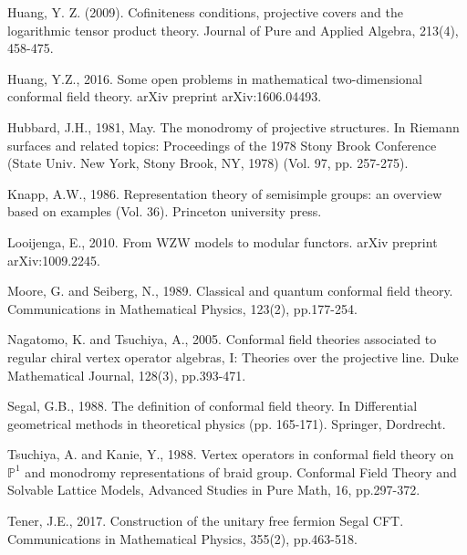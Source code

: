 \documentclass[12pt,a4paper,notitlepage]{article}
\theoremstyle{definition}
\theoremstyle{plain}
\newcommand{\Pbb}{\mathbb P}
\numberwithin{equation}{section}
\begin{document}
\begin{thebibliography}{999999}
Huang, Y. Z. (2009). Cofiniteness conditions, projective covers and the logarithmic tensor product theory. Journal of Pure and Applied Algebra, 213(4), 458-475.

Huang, Y.Z., 2016. Some open problems in mathematical two-dimensional conformal field theory. arXiv preprint arXiv:1606.04493.

Hubbard, J.H., 1981, May. The monodromy of projective structures. In Riemann surfaces and related topics: Proceedings of the 1978 Stony Brook Conference (State Univ. New York, Stony Brook, NY, 1978) (Vol. 97, pp. 257-275).
		



Knapp, A.W., 1986. Representation theory of semisimple groups: an overview based on examples (Vol. 36). Princeton university press.




Looijenga, E., 2010. From WZW models to modular functors. arXiv preprint arXiv:1009.2245.

Moore, G. and Seiberg, N., 1989. Classical and quantum conformal field theory. Communications in Mathematical Physics, 123(2), pp.177-254.

Nagatomo, K. and Tsuchiya, A., 2005. Conformal field theories associated to regular chiral vertex operator algebras, I: Theories over the projective line. Duke Mathematical Journal, 128(3), pp.393-471.

Segal, G.B., 1988. The definition of conformal field theory. In Differential geometrical methods in theoretical physics (pp. 165-171). Springer, Dordrecht.

Tsuchiya, A. and Kanie, Y., 1988. Vertex operators in conformal field theory on $\Pbb^1$ and monodromy representations of braid group. Conformal Field Theory and Solvable Lattice Models, Advanced Studies in Pure Math, 16, pp.297-372.

Tener, J.E., 2017. Construction of the unitary free fermion Segal CFT. Communications in Mathematical Physics, 355(2), pp.463-518.




\end{thebibliography}
\end{document}
